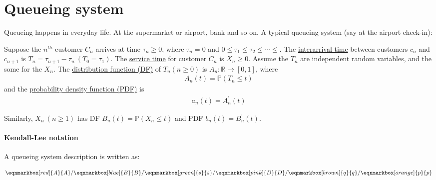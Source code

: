 \section{Queueing system}
Queueing happens in everyday life. At the supermarket or airport, bank and so on. A typical queueing system (say at the airport check-in): 


Suppose the $n^{th}$ customer $C_n$ arrives at time $\tau_n\geqslant 0$, where $\tau_n =0$ and $0\leqslant \tau_1\leqslant \tau_2\leqslant \cdots\leqslant $. The \uline{interarrival time} between customers $c_n$ and $c_{n+1}$ is $T_n = \tau_{n+1} - \tau_n\ (T_0 = \tau_1)$. The \uline{service time} for customer $C_n$ is $X_n\geqslant 0$. Assume the $T_n$ are independent random variables, and the some for the $X_n$. The \uline{distribution function (DF)} of $T_n(n\geqslant 0)$ is $A_n:\mathbb{R}\to [0, 1]$, where
\begin{align*}
    A_n(t) = \mathbb{P}(T_n\leqslant t)
\end{align*}
and the \uline{probability density function (PDF)} is 
\begin{align*}
    a_n(t) = A_n^{\prime}(t)
\end{align*}

Similarly, $X_n\ (n\geqslant 1)$ has DF $B_n(t) = \mathbb{P}(X_n\leqslant t)$ and PDF $b_n(t) = B_n^{\prime}(t)$. 

\paragraph{Kendall-Lee notation} A queueing system description is written as:

\vspace{1em}
\begin{align}
    \eqnmarkbox[red]{A}{A}/\eqnmarkbox[blue]{B}{B}/\eqnmarkbox[green]{s}{s}/\eqnmarkbox[pink]{D}{D}/\eqnmarkbox[brown]{q}{q}/\eqnmarkbox[orange]{p}{p} \label{4.1}
\end{align}

